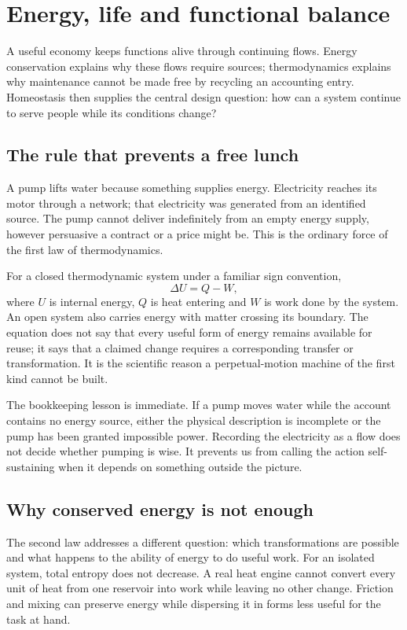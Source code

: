 \chapter{Energy, life and functional balance}\label{ch:homeostasis}

A useful economy keeps functions alive through continuing flows. Energy conservation explains why these flows require sources; thermodynamics explains why maintenance cannot be made free by recycling an accounting entry. Homeostasis then supplies the central design question: how can a system continue to serve people while its conditions change?


\section{The rule that prevents a free lunch}
A pump lifts water because something supplies energy. Electricity reaches its motor through a network; that electricity was generated from an identified source. The pump cannot deliver indefinitely from an empty energy supply, however persuasive a contract or a price might be. This is the ordinary force of the first law of thermodynamics.

For a closed thermodynamic system under a familiar sign convention,
\begin{equation}
 \Delta U=Q-W ,
\end{equation}
where $U$ is internal energy, $Q$ is heat entering and $W$ is work done by the system. An open system also carries energy with matter crossing its boundary. The equation does not say that every useful form of energy remains available for reuse; it says that a claimed change requires a corresponding transfer or transformation. It is the scientific reason a perpetual-motion machine of the first kind cannot be built.\cite{intro-energy}

The bookkeeping lesson is immediate. If a pump moves water while the account contains no energy source, either the physical description is incomplete or the pump has been granted impossible power. Recording the electricity as a flow does not decide whether pumping is wise. It prevents us from calling the action self-sustaining when it depends on something outside the picture.

\section{Why conserved energy is not enough}
The second law addresses a different question: which transformations are possible and what happens to the ability of energy to do useful work. For an isolated system, total entropy does not decrease. A real heat engine cannot convert every unit of heat from one reservoir into work while leaving no other change. Friction and mixing can preserve energy while dispersing it in forms less useful for the task at hand.\cite{intro-energy}

